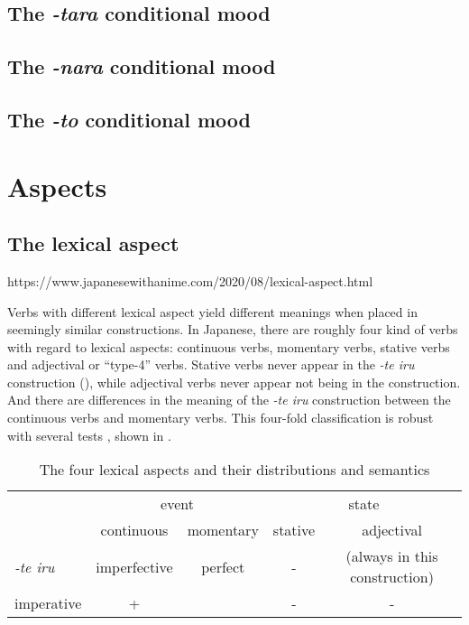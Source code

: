 \documentclass[UTF8, a4paper, oneside, scheme=plain]{ctexrep}
\newcommand*{\citesec}[1]{\S~{#1}}
\newcommand{\corpus}[1]{\emph{#1}}
\begin{document}
\subsection{The \corpus{-tara} conditional mood}\label{sec:tara-form}

\subsection{The \corpus{-nara} conditional mood}

\subsection{The \corpus{-to} conditional mood}

\section{Aspects}\label{sec:aspect}

\subsection{The lexical aspect}\label{sec:lexical-aspect}

https://www.japanesewithanime.com/2020/08/lexical-aspect.html

Verbs with different lexical aspect yield different meanings 
when placed in seemingly similar constructions.
In Japanese, there are roughly four kind of verbs with regard to lexical aspects:
continuous verbs, momentary verbs, stative verbs and adjectival or ``type-4'' verbs.
Stative verbs never appear in the \corpus{-te iru} construction (),
while adjectival verbs never appear not being in the construction.
And there are differences in the meaning of the \corpus{-te iru} construction 
between the continuous verbs and momentary verbs.
This four-fold classification is robust with several tests \citep[\citesec{3.1}]{gu2004},
shown in .

\begin{table}[H]
    \centering
    \caption{The four lexical aspects and their distributions and semantics}
    \label{tbl:lexical-aspect}
    \begin{tabular}{lcccc}
        \toprule
                     & \multicolumn{2}{c}{event} & \multicolumn{2}{c}{state} \\
                     & continuous    & momentary & stative    & adjectival   \\ \midrule
    \corpus{-te iru} & imperfective  & perfect   & -          & (always in this construction)       \\ 
    imperative       & +             &           & -          & -             \\  \bottomrule
    \end{tabular}
\end{table}
\end{document}
